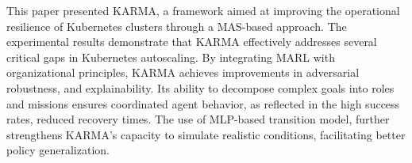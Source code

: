 This paper presented KARMA, a framework aimed at improving the operational resilience of Kubernetes clusters through a MAS-based approach.
The experimental results demonstrate that KARMA effectively addresses several critical gaps in Kubernetes autoscaling. By integrating MARL with organizational principles, KARMA achieves improvements in adversarial robustness, and explainability. Its ability to decompose complex goals into roles and missions ensures coordinated agent behavior, as reflected in the high success rates, reduced recovery times. The use of MLP-based transition model, further strengthens KARMA's capacity to simulate realistic conditions, facilitating better policy generalization.
%
%

